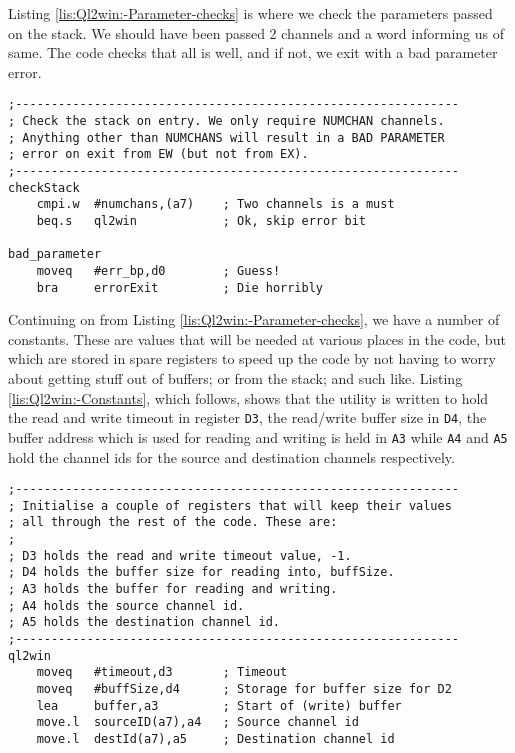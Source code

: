 Listing \ref{lis:Ql2win:-Parameter-checks} is where we check the
parameters passed on the stack. We should have been passed 2 channels
and a word informing us of same. The code checks that all is well,
and if not, we exit with a bad parameter error.

\begin{lstlisting}[caption={Ql2win: Parameter checks},label={lis:Ql2win:-Parameter-checks},firstnumber=57]
;--------------------------------------------------------------
; Check the stack on entry. We only require NUMCHAN channels. 
; Anything other than NUMCHANS will result in a BAD PARAMETER 
; error on exit from EW (but not from EX).
;--------------------------------------------------------------
checkStack
    cmpi.w  #numchans,(a7)    ; Two channels is a must
    beq.s   ql2win            ; Ok, skip error bit

bad_parameter
    moveq   #err_bp,d0        ; Guess!
    bra     errorExit         ; Die horribly
\end{lstlisting}

Continuing on from Listing \ref{lis:Ql2win:-Parameter-checks}, we
have a number of constants. These are values that will be needed at
various places in the code, but which are stored in spare registers
to speed up the code by not having to worry about getting stuff out
of buffers; or from the stack; and such like. Listing \ref{lis:Ql2win:-Constants},
which follows, shows that the utility is written to hold the read
and write timeout in register \lstinline[basicstyle={\ttfamily},showstringspaces=false]!D3!,
the read/write buffer size in \lstinline[basicstyle={\ttfamily},showstringspaces=false]!D4!,
the buffer address which is used for reading and writing is held in
\lstinline[basicstyle={\ttfamily},showstringspaces=false]!A3! while
\lstinline[basicstyle={\ttfamily},showstringspaces=false]!A4! and
\lstinline[basicstyle={\ttfamily},showstringspaces=false]!A5! hold
the channel ids for the source and destination channels respectively.

\begin{lstlisting}[caption={Ql2win: Constants},label={lis:Ql2win:-Constants},firstnumber=69]
;--------------------------------------------------------------
; Initialise a couple of registers that will keep their values 
; all through the rest of the code. These are:
;
; D3 holds the read and write timeout value, -1.
; D4 holds the buffer size for reading into, buffSize.
; A3 holds the buffer for reading and writing.
; A4 holds the source channel id.
; A5 holds the destination channel id.
;--------------------------------------------------------------
ql2win
    moveq   #timeout,d3       ; Timeout
    moveq   #buffSize,d4      ; Storage for buffer size for D2
    lea     buffer,a3         ; Start of (write) buffer
    move.l  sourceID(a7),a4   ; Source channel id
    move.l  destId(a7),a5     ; Destination channel id
\end{lstlisting}

